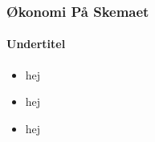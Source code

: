 
\begin{frame}
\frametitle{Økonomi På Skemaet}
\framesubtitle{Undertitel} %
    \begin{itemize}
        \item{hej}
        \pause
        \item{hej}
        \pause
        \item{hej}
    \end{itemize}
\end{frame}
    
